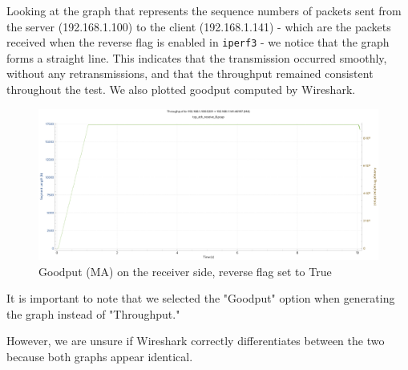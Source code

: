 Looking at the graph that represents the sequence numbers of packets sent from the server (192.168.1.100) to the client (192.168.1.141) - which are the packets received when the reverse flag is enabled in \texttt{iperf3} - we notice that the graph forms a straight line. This indicates that the transmission occurred smoothly, without any retransmissions, and that the throughput remained consistent throughout the test.
We also plotted goodput computed by Wireshark.
\begin{figure}[H]
    \centering
    \includegraphics[width=0.75\linewidth]{GoodputEth.pdf}
    \caption{Goodput (MA) on the receiver side, reverse flag set to True}
    \label{fig:enter-label}
\end{figure}
It is important to note that we selected the "Goodput" option when generating the graph instead of "Throughput." 

However, we are unsure if Wireshark correctly differentiates between the two because both graphs appear identical.

